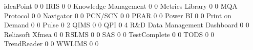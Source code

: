 \documentclass{article}
\begin{document}
\begin{Schunk}
\begin{Soutput}
  ideaPoint                                            0             0
  IRIS                                                 0             0
  Knowledge Management                                 0             0
  Metrics Library                                      0             0
  MQA Protocol                                         0             0
  Navigator                                            0             0
  PCN/SCN                                              0             0
  PEAR                                                 0             0
  Power BI                                             0             0
  Print on Demand                                      0             0
  Pulse                                                0             2
  QIMS                                                 0             0
  QPI                                                  0             4
  R&D Data Management Dashboard                        0             0
  Reliasoft Xfmea                                      0             0
  RSLMS                                                0             0
  SAS                                                  0             0
  TestComplete                                         0             0
  TODS                                                 0             0
  TrendReader                                          0             0
  WWLIMS                                               0             0
                                          

\end{Soutput}
\end{Schunk}
\end{document}
